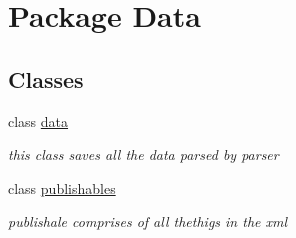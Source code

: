 \hypertarget{namespace_data}{}\section{Package Data}
\label{namespace_data}
\subsection*{Classes}
\begin{DoxyCompactItemize}
\item 
class \hyperlink{class_data_1_1data}{data}
\begin{DoxyCompactList}\small\item\em this class saves all the data parsed by parser \end{DoxyCompactList}\item 
class \hyperlink{class_data_1_1publishables}{publishables}
\begin{DoxyCompactList}\small\item\em publishale comprises of all thethigs in the xml \end{DoxyCompactList}\end{DoxyCompactItemize}
